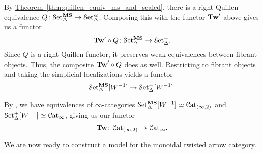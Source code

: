 \documentclass[main.tex]{subfiles}
\begin{document}
By \hyperref[thm:quillen_equiv_ms_and_scaled]{Theorem~\ref*{thm:quillen_equiv_ms_and_scaled}}, there is a right Quillen equivalence $Q\colon \mathcal{S}\mathrm{et}_{\Delta}^{\mathbf{MS}} \to \mathcal{S}\mathrm{et}_{\Delta}^{\mathrm{sc}}$. Composing this with the functor $\mathbf{Tw}'$ above gives us a functor
\begin{equation*}
  \mathbf{Tw}' \circ Q\colon \mathcal{S}\mathrm{et}_{\Delta}^{\mathbf{MS}} \to \mathcal{S}\mathrm{et}_{\Delta}^{+}.
\end{equation*}
Since $Q$ is a right Quillen functor, it preserves weak equivalences between fibrant objects. Thus, the composite $\mathbf{Tw}' \circ Q$ does as well. Restricting to fibrant objects and taking the simplicial localizations yields a functor
\begin{equation*}
  \mathcal{S}\mathrm{et}_{\Delta}^{\mathbf{MS}}[W^{-1}] \to \mathcal{S}\mathrm{et}_{\Delta}^{+}[W^{-1}].
\end{equation*}

By \cite[Example~1.3.4.8]{luriehigheralgebra}, we have equivalences of $\infty$-categories $\mathcal{S}\mathrm{et}_{\Delta}^{\mathbf{MS}}[W^{-1}] \simeq \mathcal{C}\mathrm{at}_{(\infty,2)}$ and $\mathcal{S}\mathrm{et}_{\Delta}^{+}[W^{-1}] \simeq \mathcal{C}\mathrm{at}_{\infty}$, giving us our functor
\begin{equation*}
  \mathbf{Tw}\colon \mathcal{C}\mathrm{at}_{(\infty,2)} \to \mathcal{C}\mathrm{at}_{\infty}.
\end{equation*}

We are now ready to construct a model for the monoidal twisted arrow category.
\end{document}
